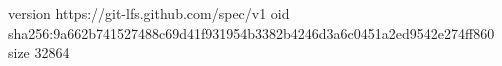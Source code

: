 version https://git-lfs.github.com/spec/v1
oid sha256:9a662b741527488c69d41f931954b3382b4246d3a6c0451a2ed9542e274ff860
size 32864
